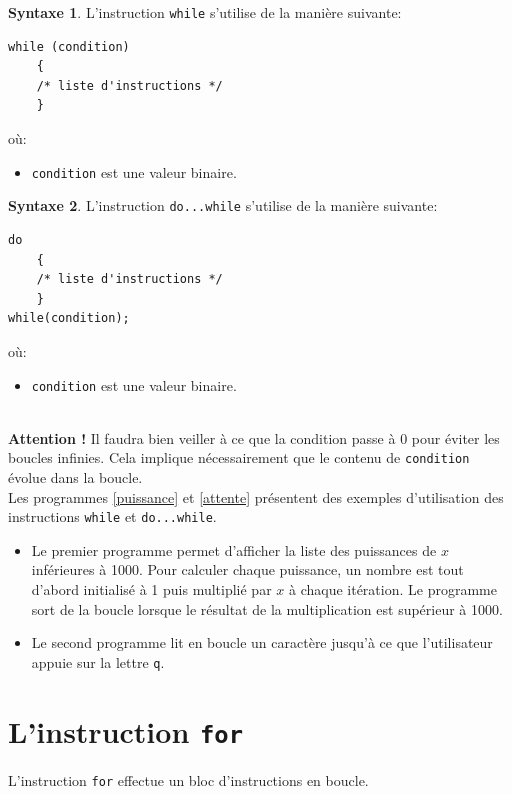 \documentclass[a4paper,11pt]{book}
\newenvironment{warning} 
   {~\\ \textbf{Attention !}}{\\}
\theoremstyle{definition}
\newtheorem*{syntaxe}{Syntaxe}
\begin{document}
\begin{syntaxe}L'instruction \texttt{while} s'utilise de la manière suivante:
\begin{lstlisting}
while (condition)
    {
    /* liste d'instructions */
    }
\end{lstlisting}
où:
\begin{itemize}
\item \texttt{condition} est une valeur binaire.
\end{itemize}
\end{syntaxe}
\begin{syntaxe}L'instruction \texttt{do...while} s'utilise de la manière suivante:
\begin{lstlisting}
do
    {
    /* liste d'instructions */
    }
while(condition);
\end{lstlisting}
où:
\begin{itemize}
\item \texttt{condition} est une valeur binaire.
\end{itemize}
\end{syntaxe}

\begin{warning}
Il faudra bien veiller à ce que la condition passe à 0 pour éviter les boucles infinies. Cela
implique nécessairement que le contenu de \texttt{condition} évolue dans la boucle. 
\end{warning}
 Les programmes
\ref{puissance} et \ref{attente} présentent des exemples
d'utilisation des instructions \texttt{while} et \texttt{do...while}.
\begin{itemize}
\item Le premier programme permet d'afficher la liste des puissances de $x$ inférieures à 1000. Pour calculer chaque puissance, un nombre est tout d'abord initialisé à 1 puis multiplié par $x$ à chaque itération. Le programme sort de la boucle lorsque le résultat de la multiplication est supérieur à 1000.
\item Le second programme lit en boucle un caractère jusqu'à ce que
l'utilisateur appuie sur la lettre \texttt{q}.
\end{itemize}






\section{L'instruction \texttt{for}}
 L'instruction \texttt{for} effectue  un bloc
d'instructions en boucle.
\end{document}
